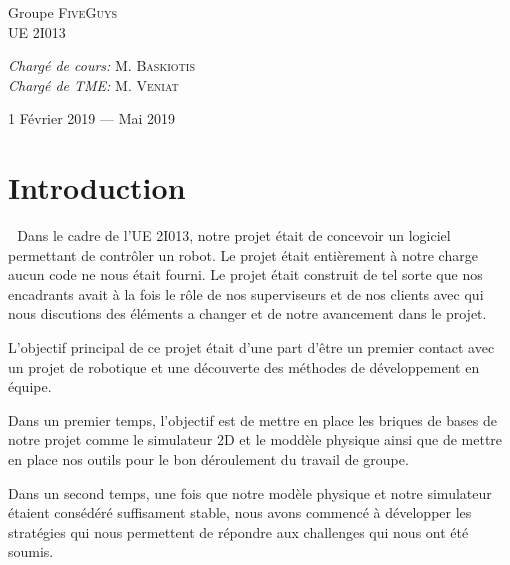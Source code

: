 \documentclass[12pt]{article}
\def\tab{$\>\>\>$}
\begin{document}
\begin{titlepage}
\begin{sffamily}
\begin{center}
    \begin{minipage}{0.4\textwidth}
      \begin{flushleft} \large
        Groupe \textsc{FiveGuys}\\
        UE 2I013\\
      \end{flushleft}
    \end{minipage}
    \begin{minipage}{0.4\textwidth}
      \begin{flushright} \large
        \emph{Chargé de cours:} M. \textsc{Baskiotis}\\
        \emph{Chargé de TME:} M. \textsc{Veniat}
      \end{flushright}
    \end{minipage}

    \vfill

    {\large 1\ier{} Février 2019 — Mai 2019}

  \end{center}
  \end{sffamily}
\end{titlepage}

\tableofcontents
\newpage

\section{Introduction}

\tab Dans le cadre de l'UE 2I013, notre projet était de concevoir un logiciel permettant de contrôler un robot. Le projet était entièrement à notre charge aucun code ne nous était fourni. Le projet était construit de tel sorte que nos encadrants avait à la fois le rôle de nos superviseurs et de nos clients avec qui nous discutions des éléments a changer et de notre avancement dans le projet.

L'objectif principal de ce projet était d'une part d'être un premier contact avec un projet de robotique et une découverte des méthodes de développement en équipe.

Dans un premier temps, l'objectif est de mettre en place les briques de bases de notre projet comme le simulateur 2D et le moddèle physique ainsi que de mettre en place nos outils pour le bon déroulement du travail de groupe.

Dans un second temps, une fois que notre modèle physique et notre simulateur étaient consédéré suffisament stable, nous avons commencé à développer les stratégies qui nous permettent de répondre aux challenges qui nous ont été soumis.
\end{document}
